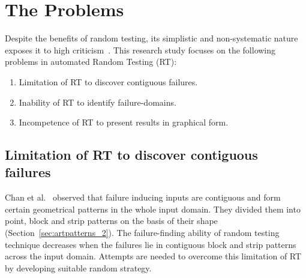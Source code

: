 \section{The Problems}
Despite the benefits of random testing, its simplistic and non-systematic nature exposes it to high criticism~\cite{myers2011art, white1987software}. This research study focuses on the following problems in automated Random Testing (RT):


\begin{enumerate}
\item Limitation of RT to discover contiguous failures.
\item Inability of RT to identify failure-domains.
\item Incompetence of RT to present results in graphical form. 
\end{enumerate}

\subsection{Limitation of RT to discover contiguous failures}
Chan et al.~\cite{chan1996proportional} observed that failure inducing inputs are contiguous and form certain geometrical patterns in the whole input domain. They divided them into point, block and strip patterns on the basis of their shape (Section~\ref{sec:artpatterns_2}). %
The failure-finding ability of random testing technique decreases when the failures lie in contiguous block and strip patterns across the input domain. Attempts are needed to overcome this limitation of RT by developing suitable random strategy.

